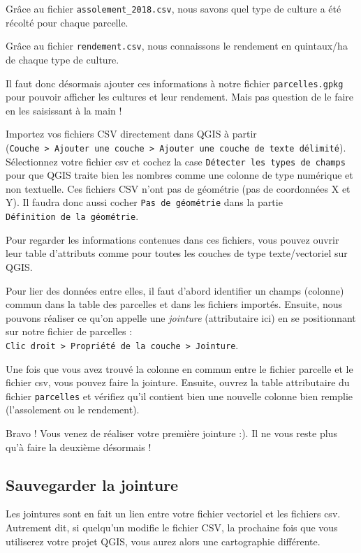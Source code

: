 Grâce au fichier \texttt{assolement\_2018.csv}, nous savons quel type de
culture a été récolté pour chaque parcelle.

Grâce au fichier \texttt{rendement.csv}, nous connaissons le rendement
en quintaux/ha de chaque type de culture.

Il faut donc désormais ajouter ces informations à notre fichier
\texttt{parcelles.gpkg} pour pouvoir afficher les cultures et leur
rendement. Mais pas question de le faire en les saisissant à la main !

Importez vos fichiers CSV directement dans QGIS à partir
(\texttt{Couche\ \textgreater{}\ Ajouter\ une\ couche\ \textgreater{}\ Ajouter\ une\ couche\ de\ texte\ délimité}).
Sélectionnez votre fichier csv et cochez la case
\texttt{Détecter\ les\ types\ de\ champs} pour que QGIS traite bien les
nombres comme une colonne de type numérique et non textuelle. Ces
fichiers CSV n'ont pas de géométrie (pas de coordonnées X et Y). Il
faudra donc aussi cocher \texttt{Pas\ de\ géométrie} dans la partie
\texttt{Définition\ de\ la\ géométrie}.

Pour regarder les informations contenues dans ces fichiers, vous pouvez
ouvrir leur table d'attributs comme pour toutes les couches de type
texte/vectoriel sur QGIS.

Pour lier des données entre elles, il faut d'abord identifier un champs
(colonne) commun dans la table des parcelles et dans les fichiers
importés. Ensuite, nous pouvons réaliser ce qu'on appelle une
\emph{jointure} (attributaire ici) en se positionnant sur notre fichier
de parcelles :
\texttt{Clic\ droit\ \textgreater{}\ Propriété\ de\ la\ couche\ \textgreater{}\ Jointure}.

Une fois que vous avez trouvé la colonne en commun entre le fichier
parcelle et le fichier csv, vous pouvez faire la jointure. Ensuite,
ouvrez la table attributaire du fichier \texttt{parcelles} et vérifiez
qu'il contient bien une nouvelle colonne bien remplie (l'assolement ou
le rendement).

Bravo ! Vous venez de réaliser votre première jointure :). Il ne vous
reste plus qu'à faire la deuxième désormais !

\subsection{Sauvegarder la jointure}\label{sauvegarder-la-jointure}

Les jointures sont en fait un lien entre votre fichier vectoriel et les
fichiers csv. Autrement dit, si quelqu'un modifie le fichier CSV, la
prochaine fois que vous utiliserez votre projet QGIS, vous aurez alors
une cartographie différente.

